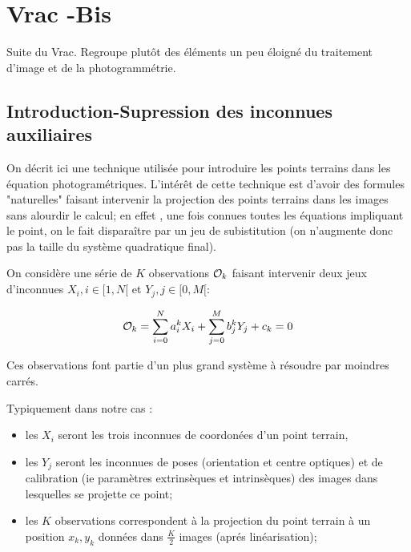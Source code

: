 \chapter{Vrac -Bis }

Suite du Vrac. Regroupe plut\^ot des \'el\'ements un peu 
\'eloign\'e du traitement d'image et de la photogramm\'etrie.


\section{Introduction-Supression des inconnues auxiliaires}

\label{UnkAux:Var}

On d\'ecrit ici une technique utilis\'ee pour introduire les
points terrains dans les \'equation photogram\'etriques. L'int\'er\^et
de cette technique est d'avoir des formules "naturelles"
faisant intervenir la projection des points terrains dans
les images sans alourdir le calcul; en effet , une fois connues
toutes les \'equations impliquant le point, on le fait 
dispara\^itre par un jeu de subistitution (on n'augmente
donc pas la taille du syst\`eme quadratique final).

On consid\`ere une s\'erie de $K$ observations ${\mathcal O}_{k}$ faisant
intervenir deux jeux d'inconnues $X_i, i \in [1,N[$ et $Y_j, j \in [0,M[$:

\begin{equation}
   {\mathcal O}_{k} = \sum_{i=0}^N a^k_i X_i + \sum_{j=0}^M b^k_j Y_j + c_k = 0
\end{equation}

Ces observations font partie d'un plus grand syst\`eme \`a r\'esoudre
par moindres carr\'es.

Typiquement dans notre cas :

\begin{itemize}
    \item   les $X_i$ seront les trois inconnues de coordon\'ees
            d'un point terrain,   

     \item   les  $Y_j$ seront les inconnues de poses
             (orientation et centre optiques) et de calibration
	     (ie param\`etres extrins\`eques et intrins\`eques) des
	     images dans lesquelles se projette ce point;

     \item les $K$ observations correspondent \`a la projection du 
           point terrain \`a un position $x_k,y_k$ donn\'ees 
	   dans $\frac{K}{2}$  images (apr\'es lin\'earisation);

\end{itemize}

